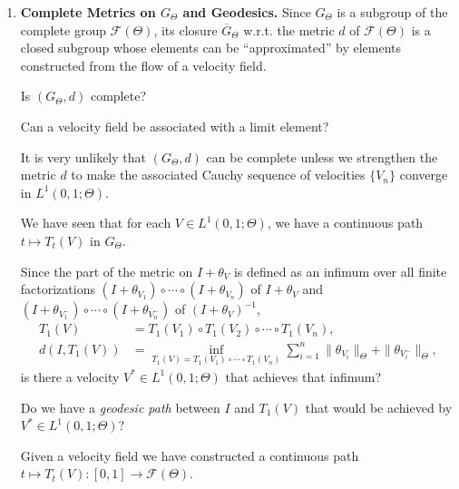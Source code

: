 \documentclass{book}
\numberwithin{equation}{section}
\newtheorem{remark}{Remark}[section]
\begin{document}
\begin{enumerate}
    \begin{remark}
        Note that the condition $(I - \theta)^{-1}$ exists and $(I - \theta)^{-1}\in\Theta$ in the definition of $\mathcal{F}(\Theta)$ is automatically verified for the transformations $I + \theta_V$ generated by a velocity field $V\in L^1(0,1;\Theta)$.
    \end{remark}
    \item \textbf{Complete Metrics on $G_\Theta$ and Geodesics.} Since $G_\Theta$ is a subgroup of the complete group $\mathcal{F}(\Theta)$, its closure $\overline{G}_\Theta$ w.r.t. the metric $d$ of $\mathcal{F}(\Theta)$ is a closed subgroup whose elements can be ``approximated'' by elements constructed from the flow of a velocity field.
    
    Is $(G_\Theta,d)$ complete?
    
    Can a velocity field be associated with a limit element?
    
    It is very unlikely that $(G_\Theta,d)$ can be complete unless we strengthen the metric $d$ to make the associated Cauchy sequence of velocities $\{V_n\}$ converge in $L^1(0,1;\Theta)$.
    
    We have seen that for each $V\in L^1(0,1;\Theta)$, we have a continuous path $t\mapsto T_t(V)$ in $G_\Theta$.
    
    Since the part of the metric on $I + \theta_V$ is defined as an infimum over all finite factorizations $(I + \theta_{V_1})\circ\cdots \circ(I + \theta_{V_n})$ of $I + \theta_V$ and $(I + \theta_{V_1^-})\circ\cdots\circ(I + \theta_{V_n^-})$ of $(I + \theta_V)^{-1}$,
    \begin{align*}
        T_1(V) &= T_1(V_1)\circ T_1(V_2)\circ\cdots\circ T_1(V_n),\\
        d\left(I,T_1(V)\right) &= \inf_{T_1(V) = T_1(V_1)\circ\cdots\circ T_1(V_n)} \sum_{i=1}^n \|\theta_{V_i}\|_\Theta + \|\theta_{V_i^-}\|_\Theta,
    \end{align*}
    is there a velocity $V^*\in L^1(0,1;\Theta)$ that achieves that infimum?
    
    Do we have a \textit{geodesic path} between $I$ and $T_1(V)$ that would be achieved by $V^*\in L^1(0,1;\Theta)$?
    
    Given a velocity field we have constructed a continuous path $t\mapsto T_t(V):[0,1]\to\mathcal{F}(\Theta)$.
    

\end{enumerate}
\end{document}
